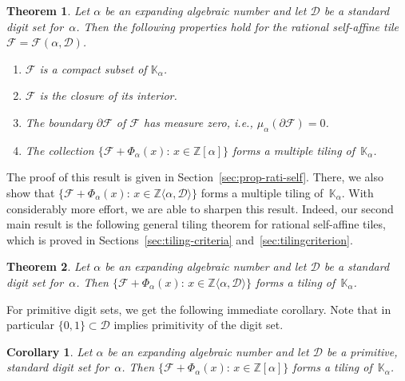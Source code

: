 \documentclass[12pt]{amsart}
\newtheorem{theorem}{Theorem}
\newtheorem{corollary}{Corollary}
\theoremstyle{definition}
\theoremstyle{remark}
\numberwithin{equation}{section}
\begin{document}
\begin{theorem}\label{basicProperties}
Let $\alpha$ be an expanding algebraic number and let $\mathcal{D}$ be a standard digit set for~$\alpha$.
Then the following properties hold for the rational self-affine tile $\mathcal{F} = \mathcal{F}(\alpha,\mathcal{D})$.

\begin{enumerate}
\item \label{property1}
$\mathcal{F}$ is a compact subset of $\mathbb{K}_\alpha$.
\item \label{property2}
$\mathcal{F}$ is the closure of its interior.
\item \label{property3}
The boundary $\partial\mathcal{F}$ of $\mathcal{F}$ has measure zero, i.e., $\mu_\alpha(\partial\mathcal{F})=0$.
\item \label{property5}
The collection $\{\mathcal{F} + \Phi_\alpha(x):\, x \in \mathbb{Z}[\alpha]\}$ forms a multiple tiling of~$\mathbb{K}_\alpha$.
\end{enumerate}
\end{theorem}

The proof of this result is given in Section~\ref{sec:prop-rati-self}.
There, we also show that $\{\mathcal{F} + \Phi_\alpha(x):\, x \in \mathbb{Z}\langle \alpha, \mathcal{D}\rangle\}$ forms a multiple tiling of~$\mathbb{K}_\alpha$.
With considerably more effort, we are able to sharpen this result.
Indeed, our second main result is the following general tiling theorem for rational self-affine tiles, which is proved in Sections~\ref{sec:tiling-criteria} and~\ref{sec:tilingcriterion}.

\begin{theorem} \label{newtilingtheorem}
Let $\alpha$ be an expanding algebraic number and let $\mathcal{D}$ be a standard digit set for~$\alpha$.
Then $\{\mathcal{F} + \Phi_\alpha(x):\, x \in \mathbb{Z}\langle \alpha, \mathcal{D}\rangle\}$ forms a tiling of~$\mathbb{K}_\alpha$.
\end{theorem}

For primitive digit sets, we get the following immediate corollary.
Note that in particular $\{0,1\} \subset \mathcal{D}$ implies primitivity of the digit set.

\begin{corollary} \label{c:1}
Let $\alpha$ be an expanding algebraic number and let $\mathcal{D}$ be a primitive, standard digit set for~$\alpha$.
Then $\{\mathcal{F} + \Phi_\alpha(x):\, x \in \mathbb{Z}[\alpha]\}$ forms a tiling of~$\mathbb{K}_\alpha$.
\end{corollary}
\end{document}
